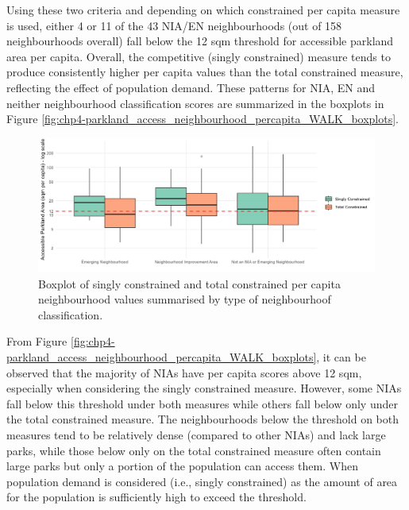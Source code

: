 \documentclass[
11pt, %
oneside, %
english, %
singlespacing, %
]{macthesis} %
\begin{document}
Using these two criteria and depending on which constrained per capita measure is used, either 4 or 11 of the 43 NIA/EN neighbourhoods (out of 158 neighbourhoods overall) fall below the 12 sqm threshold for accessible parkland area per capita. Overall, the competitive (singly constrained) measure tends to produce consistently higher per capita values than the total constrained measure, reflecting the effect of population demand. These patterns for NIA, EN and neither neighbourhood classification scores are summarized in the boxplots in Figure \ref{fig:chp4-parkland_access_neighbourhood_percapita_WALK_boxplots}.

\begin{figure}

{\centering \includegraphics[width=6in]{./data/figures/chp4-parkland_access_neighbourhood_percapita_WALK_boxplots} 

}

\caption{\label{fig:chp4-parkland_access_neighbourhood_percapita_WALK_boxplots} Boxplot of singly constrained and total constrained per capita neighbourhood values summarised by type of neighbourhoof classification. }\label{fig:unnamed-chunk-62}
\end{figure}

From Figure \ref{fig:chp4-parkland_access_neighbourhood_percapita_WALK_boxplots}, it can be observed that the majority of NIAs have per capita scores above 12 sqm, especially when considering the singly constrained measure. However, some NIAs fall below this threshold under both measures while others fall below only under the total constrained measure. The neighbourhoods below the threshold on both measures tend to be relatively dense (compared to other NIAs) and lack large parks, while those below only on the total constrained measure often contain large parks but only a portion of the population can access them. When population demand is considered (i.e., singly constrained) as the amount of area for the population is sufficiently high to exceed the threshold.
\end{document}
